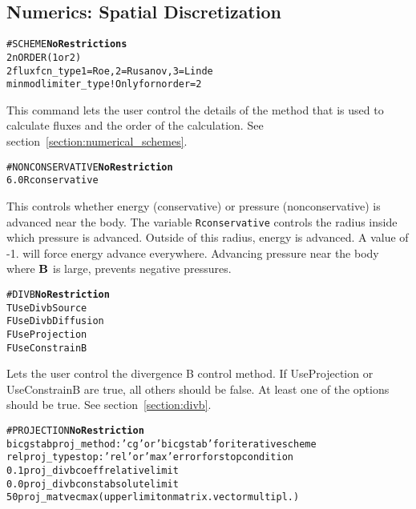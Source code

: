 \subsection{Numerics: Spatial Discretization \label{section:space}}

\begin{alltt}
#SCHEME \hfill {\bf No Restrictions}
2                      nORDER (1 or 2)
2                      fluxfcn_type  1=Roe, 2=Rusanov, 3=Linde
minmod                 limiter_type ! Only for norder=2
\end{alltt}

This command lets the user control the details of the method that is used
to calculate fluxes and the order of the calculation.  See 
section~\ref{section:numerical_schemes}.
\ \ \\

\begin{alltt}
#NONCONSERVATIVE   \hfill    {\bf No Restriction}
6.0                    Rconservative
\end{alltt}

This controls whether energy (conservative) or pressure (nonconservative) is
advanced near the body.  The variable {\tt Rconservative} controls the radius
inside which pressure is advanced.  Outside of this radius, energy is advanced.
A value of -1. will force energy advance everywhere.  Advancing pressure near
the body where ${\bf B}$ is large, prevents negative pressures.
\ \ \\

\begin{alltt}
#DIVB     \hfill    {\bf No Restriction}
T                      UseDivbSource
F                      UseDivbDiffusion
F                      UseProjection
F                      UseConstrainB
\end{alltt}

Lets the user control the divergence B control method.
If UseProjection or UseConstrainB are true, all others should be false.
At least one of the options should be true.  See section~\ref{section:divb}.
\ \ \\

\begin{alltt}
#PROJECTION  \hfill  {\bf No Restriction}
bicgstab               proj_method:   'cg' or 'bicgstab' for iterative scheme
rel                    proj_typestop: 'rel' or 'max' error for stop condition
0.1                    proj_divbcoeff relative limit
0.0                    proj_divbconst absolute limit 
50                     proj_matvecmax	(upper limit on matrix.vector multipl.)
\end{alltt}

